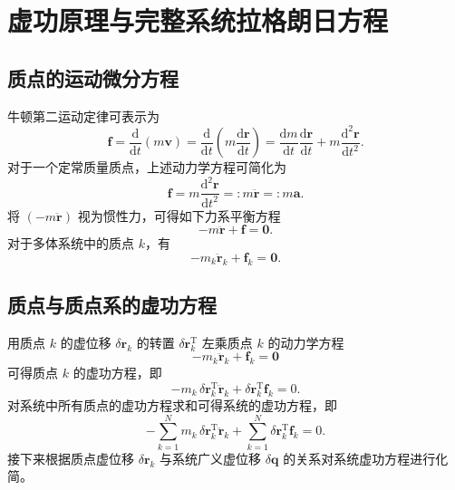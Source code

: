 \section{虚功原理与完整系统拉格朗日方程}

\subsection{质点的运动微分方程}

牛顿第二运动定律可表示为
\begin{equation*}
\boldsymbol{f} = \frac{\mathrm{d}}{\mathrm{d}t}(m\boldsymbol{v}) = \frac{\mathrm{d}}{\mathrm{d}t}\!\left(m \frac{\mathrm{d}\boldsymbol{r}}{\mathrm{d}t}\right) = \frac{\mathrm{d}m}{\mathrm{d}t} \frac{\mathrm{d}\boldsymbol{r}}{\mathrm{d}t} + m \frac{\mathrm{d}^2 \boldsymbol{r}}{\mathrm{d}t^2}.
\end{equation*}
对于一个定常质量质点，上述动力学方程可简化为
\begin{equation*}
\boldsymbol{f} = m \frac{\mathrm{d}^2 \boldsymbol{r}}{\mathrm{d}t^2} =: m\ddot{\boldsymbol{r}} =: m\boldsymbol{a}.
\end{equation*}
将 $(-m\ddot{\boldsymbol{r}})$ 视为惯性力，可得如下力系平衡方程
\begin{equation}\label{eq:2.7}
-m\ddot{\boldsymbol{r}} + \boldsymbol{f} = \boldsymbol{0}.
\end{equation}
对于多体系统中的质点 $k$，有
\begin{equation}\label{eq:2.8}
-m_k \ddot{\boldsymbol{r}}_k + \boldsymbol{f}_k = \boldsymbol{0}.
\end{equation}

\subsection{质点与质点系的虚功方程}

用质点 $k$ 的虚位移 $\delta\boldsymbol{r}_k$ 的转置 $\delta\boldsymbol{r}_k^{\mathrm{T}}$ 左乘质点 $k$ 的动力学方程
\begin{equation*}
-m_k \ddot{\boldsymbol{r}}_k + \boldsymbol{f}_k = \boldsymbol{0}
\end{equation*}
可得质点 $k$ 的虚功方程，即
\begin{equation*}
-m_k \,\delta\boldsymbol{r}_k^{\mathrm{T}} \ddot{\boldsymbol{r}}_k + \delta\boldsymbol{r}_k^{\mathrm{T}} \boldsymbol{f}_k = 0.
\end{equation*}
对系统中所有质点的虚功方程求和可得系统的虚功方程，即
\begin{equation}\label{eq:2.9}
-\sum_{k=1}^{N} m_k \,\delta\boldsymbol{r}_k^{\mathrm{T}} \ddot{\boldsymbol{r}}_k + \sum_{k=1}^{N} \delta\boldsymbol{r}_k^{\mathrm{T}} \boldsymbol{f}_k = 0.
\end{equation}
接下来根据质点虚位移 $\delta\boldsymbol{r}_k$ 与系统广义虚位移 $\delta\boldsymbol{q}$ 的关系对系统虚功方程进行化简。

